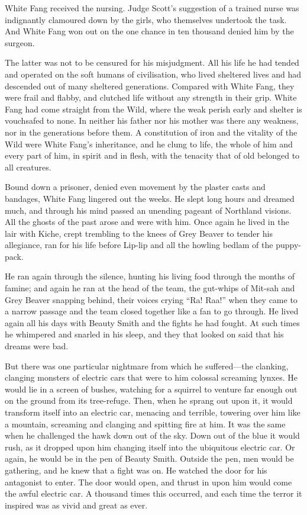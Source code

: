 \documentclass[10pt]{book}
\begin{document}
White Fang received the nursing. Judge Scott’s suggestion of a trained
nurse was indignantly clamoured down by the girls, who themselves
undertook the task. And White Fang won out on the one chance in ten
thousand denied him by the surgeon.

The latter was not to be censured for his misjudgment. All his life he
had tended and operated on the soft humans of civilisation, who lived
sheltered lives and had descended out of many sheltered generations.
Compared with White Fang, they were frail and flabby, and clutched life
without any strength in their grip. White Fang had come straight from
the Wild, where the weak perish early and shelter is vouchsafed to
none. In neither his father nor his mother was there any weakness, nor
in the generations before them. A constitution of iron and the vitality
of the Wild were White Fang’s inheritance, and he clung to life, the
whole of him and every part of him, in spirit and in flesh, with the
tenacity that of old belonged to all creatures.

Bound down a prisoner, denied even movement by the plaster casts and
bandages, White Fang lingered out the weeks. He slept long hours and
dreamed much, and through his mind passed an unending pageant of
Northland visions. All the ghosts of the past arose and were with him.
Once again he lived in the lair with Kiche, crept trembling to the
knees of Grey Beaver to tender his allegiance, ran for his life before
Lip-lip and all the howling bedlam of the puppy-pack.

He ran again through the silence, hunting his living food through the
months of famine; and again he ran at the head of the team, the
gut-whips of Mit-sah and Grey Beaver snapping behind, their voices
crying “Ra! Raa!” when they came to a narrow passage and the team
closed together like a fan to go through. He lived again all his days
with Beauty Smith and the fights he had fought. At such times he
whimpered and snarled in his sleep, and they that looked on said that
his dreams were bad.

But there was one particular nightmare from which he suffered—the
clanking, clanging monsters of electric cars that were to him colossal
screaming lynxes. He would lie in a screen of bushes, watching for a
squirrel to venture far enough out on the ground from its tree-refuge.
Then, when he sprang out upon it, it would transform itself into an
electric car, menacing and terrible, towering over him like a mountain,
screaming and clanging and spitting fire at him. It was the same when
he challenged the hawk down out of the sky. Down out of the blue it
would rush, as it dropped upon him changing itself into the ubiquitous
electric car. Or again, he would be in the pen of Beauty Smith. Outside
the pen, men would be gathering, and he knew that a fight was on. He
watched the door for his antagonist to enter. The door would open, and
thrust in upon him would come the awful electric car. A thousand times
this occurred, and each time the terror it inspired was as vivid and
great as ever.
\end{document}
